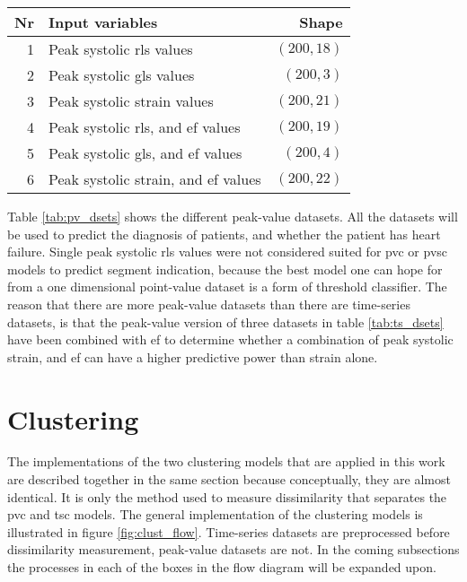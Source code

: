\begin{table*}[h]
    \centering
    \begin{tabular}{ rlr }
        \toprule
        Nr & Input variables                                           & Shape \\
        \midrule                              
        1  & Peak systolic \acrshort{rls} values                       & $(200,18)$ \\
        2  & Peak systolic \acrshort{gls} values                       & $(200,3)$  \\
        3  & Peak systolic strain values                               & $(200,21)$ \\
        4  & Peak systolic \acrshort{rls}, and \acrshort{ef} values    & $(200,19)$ \\
        5  & Peak systolic \acrshort{gls}, and \acrshort{ef} values    & $(200,4)$  \\
        6  & Peak systolic strain, and \acrshort{ef} values            & $(200,22)$ \\
        \bottomrule
    \end{tabular}
    \caption{Peak-value datasets. The ''Shape'' parameter is indicates: (Number of objects in the dataset, Number of dimensions used to represent each individual object).}
    \label{tab:pv_dsets}
\end{table*}

Table \ref{tab:pv_dsets} shows the different peak-value datasets. All the datasets will be used to predict the diagnosis of patients, and whether the patient has heart failure. Single peak systolic \acrshort{rls} values were not considered suited for \acrshort{pvc} or \acrshort{pvsc} models to predict segment indication, because the best model one can hope for from a one dimensional point-value dataset is a form of threshold classifier. The reason that there are more peak-value datasets than there are time-series datasets, is that the peak-value version of three datasets in table \ref{tab:ts_dsets} have been combined with \acrshort{ef} to determine whether a combination of peak systolic strain, and \acrshort{ef} can have a higher predictive power than strain alone.

\section{Clustering} \label{sec:meth_clust}

The implementations of the two clustering models that are applied in this work are described together in the same section because conceptually, they are almost identical. It is only the method used to measure dissimilarity that separates the \acrshort{pvc} and \acrshort{tsc} models. The general implementation of the clustering models is illustrated in figure \ref{fig:clust_flow}. Time-series datasets are preprocessed before dissimilarity measurement, peak-value datasets are not. In the coming subsections the processes in each of the boxes in the flow diagram will be expanded upon.

